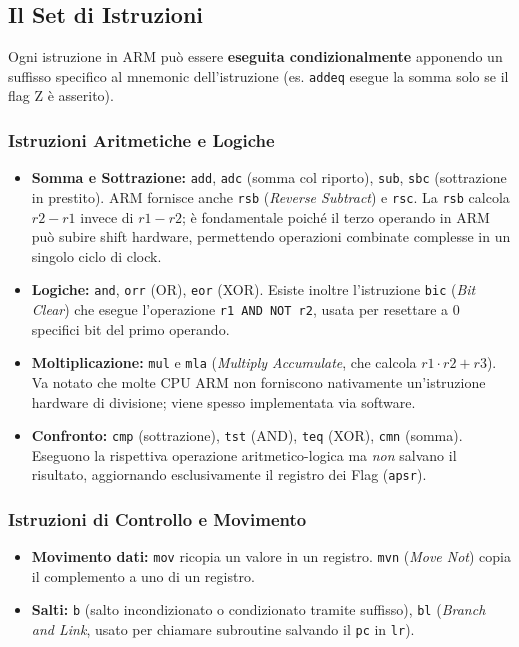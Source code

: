 \documentclass[12pt, a4paper]{article}
\begin{document}
\subsection{Il Set di Istruzioni}
Ogni istruzione in ARM può essere \textbf{eseguita condizionalmente} apponendo un suffisso specifico al mnemonic dell'istruzione (es. \texttt{addeq} esegue la somma solo se il flag Z è asserito).

\subsubsection{Istruzioni Aritmetiche e Logiche}
\begin{itemize}
    \item \textbf{Somma e Sottrazione:} \texttt{add}, \texttt{adc} (somma col riporto), \texttt{sub}, \texttt{sbc} (sottrazione in prestito). ARM fornisce anche \texttt{rsb} (\textit{Reverse Subtract}) e \texttt{rsc}. La \texttt{rsb} calcola $r2 - r1$ invece di $r1 - r2$; è fondamentale poiché il terzo operando in ARM può subire shift hardware, permettendo operazioni combinate complesse in un singolo ciclo di clock.
    \item \textbf{Logiche:} \texttt{and}, \texttt{orr} (OR), \texttt{eor} (XOR). Esiste inoltre l'istruzione \texttt{bic} (\textit{Bit Clear}) che esegue l'operazione \texttt{r1 AND NOT r2}, usata per resettare a 0 specifici bit del primo operando.
    \item \textbf{Moltiplicazione:} \texttt{mul} e \texttt{mla} (\textit{Multiply Accumulate}, che calcola $r1 \cdot r2 + r3$). Va notato che molte CPU ARM non forniscono nativamente un'istruzione hardware di divisione; viene spesso implementata via software.
    \item \textbf{Confronto:} \texttt{cmp} (sottrazione), \texttt{tst} (AND), \texttt{teq} (XOR), \texttt{cmn} (somma). Eseguono la rispettiva operazione aritmetico-logica ma \textit{non} salvano il risultato, aggiornando esclusivamente il registro dei Flag (\texttt{apsr}).
\end{itemize}

\subsubsection{Istruzioni di Controllo e Movimento}
\begin{itemize}
    \item \textbf{Movimento dati:} \texttt{mov} ricopia un valore in un registro. \texttt{mvn} (\textit{Move Not}) copia il complemento a uno di un registro.
    \item \textbf{Salti:} \texttt{b} (salto incondizionato o condizionato tramite suffisso), \texttt{bl} (\textit{Branch and Link}, usato per chiamare subroutine salvando il \texttt{pc} in \texttt{lr}).
\end{itemize}
\end{document}
